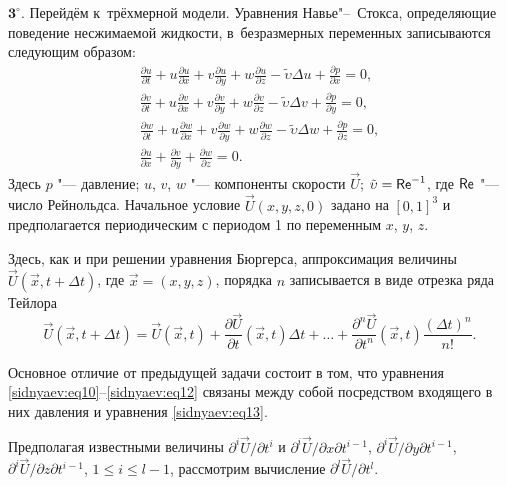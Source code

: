 \smallskip


{$\mathbf 3^\circ.$} 
Перейдём к~трёхмерной модели. 
Уравнения Навье"--~Стокса, определяющие поведение несжимаемой жидкости, в~безразмерных переменных
записываются следующим образом:
\begin{gather}
\label{sidnyaev:eq10}
\frac{\partial u}{\partial
t}+u\frac{\partial u}{\partial x}+v\frac{\partial u}{\partial
y}+w\frac{\partial u}{\partial z}-  \tilde{\upsilon}  \Delta u+\frac{\partial
p}{\partial x}=0,\\
\label{sidnyaev:eq12}
\frac{\partial v}{\partial
t}+u\frac{\partial v}{\partial x}+v\frac{\partial v}{\partial
y}+w\frac{\partial v}{\partial z}-  \tilde{\upsilon}  \Delta v+\frac{\partial
p}{\partial y}=0,\\
\label{sidnyaev:eq12}
\frac{\partial w}{\partial
t}+u\frac{\partial w}{\partial x}+v\frac{\partial w}{\partial
y}+w\frac{\partial w}{\partial z}-  \tilde{\upsilon}  \Delta w+\frac{\partial
p}{\partial z}=0,\\
\label{sidnyaev:eq13} \frac{\partial u}{\partial x}+\frac{\partial
v}{\partial y}+\frac{\partial w}{\partial z}=0.
\end{gather}
Здесь $p$ "--- давление; $u$, $v$, $w$ "--- компоненты скорости $\vec {U}$;
$  \tilde{\upsilon}  ={\sf Re}^{-1}$, где ${\sf Re}$ "--- число Рейнольдса. Начальное
условие $\vec {U}(x,y,z,0)$ задано на $[0,1]^3$ и предполагается периодическим с периодом 1 по переменным
$x$, $y$, $z$.

Здесь, как и при решении уравнения Бюргерса, аппроксимация величины $\vec {U}( \vec {x},t+\Delta t )$, где $\vec {x}=(x,y,z)$,
порядка $n$ записывается в виде отрезка ряда Тейлора
\begin{equation}
\label{sidnyaev:eq14}
\vec {U}\left( \vec {x},t+\Delta t \right)=\vec {U}\left( \vec {x},t \right)+\frac{\partial \vec
{U}}{\partial t}\left( \vec {x},t \right)\Delta
t+ \ldots +\frac{\partial^n \vec {U}}{\partial t^n}\left(\vec {x},t \right)\frac{( \Delta t)^n}{n!}.
\end{equation}

Основное отличие от предыдущей задачи состоит в том, что уравнения \eqref{sidnyaev:eq10}--\eqref{sidnyaev:eq12} связаны между собой посредством входящего в них давления и
уравнения \eqref{sidnyaev:eq13}.

Предполагая известными величины ${\partial ^i\vec {U}} / {\partial t^i}$ и ${\partial ^i\vec {U}}/{\partial x \partial t^{i-1}}$, $ {\partial^i \vec {U}} / {\partial y \partial t^{i-1}}$,
${\partial^i\vec {U}} / {\partial z\partial t^{i-1}}$, $1\le i\le l-1 $,
рассмотрим вычисление ${\partial ^l\vec {U}} / {\partial t^l}$.

